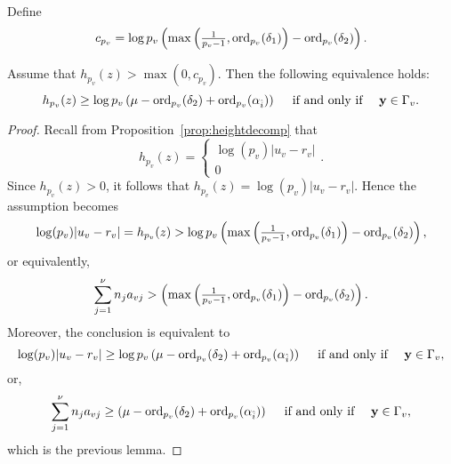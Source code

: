 %

Define 
\[c_{p_v}=\log p_v\left(\max\left(\tfrac{1}{p_v-1},\operatorname{ord}_{p_v}(\delta_1)\right)-\operatorname{ord}_{p_v}(\delta_2)\right).\]

\begin{corollary} \label{lem:cpequiv}
Assume that $h_{p_v}(z)>\max(0,c_{p_v})$. Then the following equivalence holds: 
\[h_{p_v}(z)\geq \log{p_v}\left(\mu - \operatorname{ord}_{p_v}(\delta_2) + \operatorname{ord}_{p_v}(\alpha_{\hat{i}})\right) \quad \text{ if and only if } \quad \mathbf{y} \in\Gamma_v.\]
\end{corollary}
\begin{proof}
Recall from Proposition~\ref{prop:heightdecomp} that 
\[h_{p_v}(z) = 
\begin{cases}
\log(p_v)|u_v - r_v| \\
0
\end{cases}.\]
Since $h_{p_v}(z) > 0$, it follows that $h_{p_v}(z) = \log(p_v)|u_v - r_v|$. Hence the assumption becomes
\[\log(p_v)|u_v - r_v| = h_{p_v}(z) > \log p_v\left(\max\left(\tfrac{1}{p_v-1},\operatorname{ord}_{p_v}(\delta_1)\right)-\operatorname{ord}_{p_v}(\delta_2)\right),\]
or equivalently, 
\[\sum_{j = 1}^{\nu}n_ja_{vj} > \left(\max\left(\tfrac{1}{p_v-1},\operatorname{ord}_{p_v}(\delta_1)\right)-\operatorname{ord}_{p_v}(\delta_2)\right).\]
Moreover, the conclusion is equivalent to 
\[\log(p_v)|u_v - r_v| \geq \log{p_v}\left(\mu - \operatorname{ord}_{p_v}(\delta_2) + \operatorname{ord}_{p_v}(\alpha_{\hat{i}})\right) 
	\quad \text{ if and only if } \quad \mathbf{y} \in\Gamma_v,\]
or, 
\[\sum_{j = 1}^{\nu}n_ja_{vj} \geq \left(\mu - \operatorname{ord}_{p_v}(\delta_2) + \operatorname{ord}_{p_v}(\alpha_{\hat{i}})\right) 
	\quad \text{ if and only if } \quad \mathbf{y} \in\Gamma_v,\]
which is the previous lemma. 

\end{proof}

